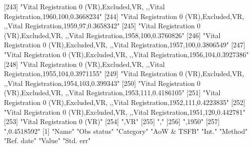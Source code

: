 [243] "Vital Registration 0 (VR),Excluded,VR, ,,Vital Registration,1960,100,0.3668234"                                               
[244] "Vital Registration 0 (VR),Excluded,VR, ,,Vital Registration,1959,97,0.3658342"                                                
[245] "Vital Registration 0 (VR),Excluded,VR, ,,Vital Registration,1958,100,0.3760826"                                               
[246] "Vital Registration 0 (VR),Excluded,VR, ,,Vital Registration,1957,100,0.3806549"                                               
[247] "Vital Registration 0 (VR),Excluded,VR, ,,Vital Registration,1956,104,0.3927386"                                               
[248] "Vital Registration 0 (VR),Excluded,VR, ,,Vital Registration,1955,104,0.3971155"                                               
[249] "Vital Registration 0 (VR),Excluded,VR, ,,Vital Registration,1954,103,0.399343"                                                
[250] "Vital Registration 0 (VR),Excluded,VR, ,,Vital Registration,1953,111,0.4186105"                                               
[251] "Vital Registration 0 (VR),Excluded,VR, ,,Vital Registration,1952,111,0.4223835"                                               
[252] "Vital Registration 0 (VR),Excluded,VR, ,,Vital Registration,1951,120,0.442781"                                                
[253] "Vital Registration 0 (VR)"                                                                                                    
[254] ",VR"                                                                                                                          
[255] ","                                                                                                                            
[256] ",1950"                                                                                                                        
[257] ",0.4518592"                                                                                                                   
[1] "Name"       "Obs status" "Category"   "AoW & TSFB" "Int."       "Method"     "Ref. date"  "Value"      "Std. err"  
